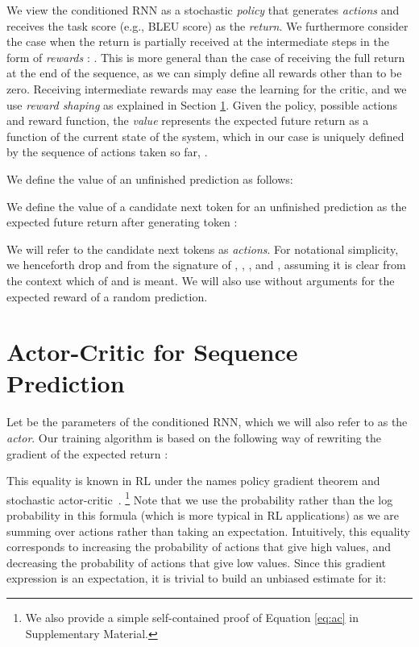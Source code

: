 \documentclass{article} \usepackage{iclr2017_conference,times}
\begin{document}
We view the conditioned RNN as a stochastic \textit{policy}
that generates \textit{actions}
and receives the task score (e.g., BLEU score)  as the \textit{return}.  
We furthermore consider the case when
the return  is partially received at the intermediate steps 
in the form of \textit{rewards} :  .  This
is more general than the case of receiving the full return at the end of the sequence, 
as we can simply define all rewards other than  to be zero.
Receiving intermediate rewards may ease the learning for the critic, and we use
\emph{reward shaping} as explained in Section \ref{sec:actor-critic}. 
Given the policy, possible actions and reward function, the \emph{value} represents the
expected future return as a function of the
current state of the system, which in our case is uniquely defined by the
sequence of actions taken so far, .

We define the value of an unfinished
prediction  as follows:
    
We define the value of a candidate next token  for an unfinished prediction 
 as the expected future return after generating token : 

We will refer to the candidate next tokens as \textit{actions}.
For notational simplicity, we henceforth drop  and  from the signature
of , , ,  and , assuming it is clear from the context which of  and  is
meant.  We will also use  without arguments for the expected reward of
a random prediction.

\section{Actor-Critic for Sequence Prediction}

\label{sec:actor-critic}

Let  be the parameters of the conditioned RNN, which we will also refer to as the \textit{actor}.
Our training algorithm is based on the following way of rewriting the gradient 
of the expected return :
 
This equality is known in RL under the names policy gradient theorem \citep{sutton1999policy}
and stochastic actor-critic~\citep{sutton1984temporal}.
\footnote{We also provide a simple self-contained proof of Equation \eqref{eq:ac} in Supplementary Material.}
Note that we use the probability rather than the log probability in this formula 
(which is more typical in RL applications) as we are summing over actions rather than taking an expectation.  
Intuitively, this equality corresponds to increasing the probability of actions 
that give high values, and decreasing the probability of actions that give low values. 
Since this gradient expression is an expectation,
it is trivial to build an unbiased estimate for it:
\end{document}
